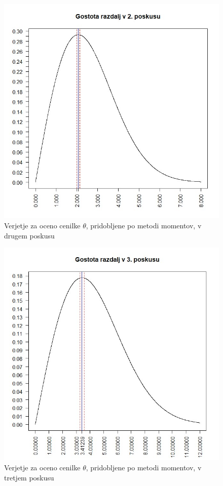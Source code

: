 \documentclass[a4paper, 10pt]{article}
\begin{document}
	\begin{figure}[h!]
		\label{fig: 2Eplot2}
		\centering
		\includegraphics[scale = 0.4]{VerjetjeMM2}
		\caption{Verjetje za oceno cenilke $\theta$, pridobljene po metodi momentov, v drugem poskusu}
	\end{figure}
	
	\begin{figure}[h!]
		\label{fig: 2Eplot3}
		\centering
		\includegraphics[scale = 0.4]{VerjetjeMM3}
		\caption{Verjetje za oceno cenilke $\theta$, pridobljene po metodi momentov, v tretjem poskusu}
	\end{figure}
	
\end{document}
